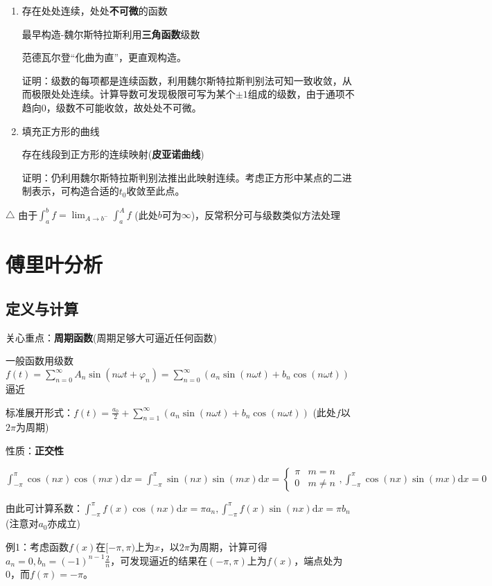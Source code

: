 \documentclass[a4paper,UTF8]{ctexart}
\begin{document}
\begin{enumerate}
\item 存在处处连续，处处\textbf{不可微}的函数
	
最早构造-魏尔斯特拉斯利用\textbf{三角函数}级数
	
范德瓦尔登“化曲为直”，更直观构造。
	
证明：级数的每项都是连续函数，利用魏尔斯特拉斯判别法可知一致收敛，从而极限处处连续。计算导数可发现极限可写为某个$\pm1$组成的级数，由于通项不趋向0，级数不可能收敛，故处处不可微。

\item 填充正方形的曲线

存在线段到正方形的连续映射(\textbf{皮亚诺曲线})

证明：仍利用魏尔斯特拉斯判别法推出此映射连续。考虑正方形中某点的二进制表示，可构造合适的$t_0$收敛至此点。
\end{enumerate}

$\triangle$ 由于$\int_a^b f=\lim_{A\to b^-}\int_a^A f$ (此处$b$可为$\infty$)，反常积分可与级数类似方法处理

\section{傅里叶分析}
\subsection{定义与计算}
关心重点：\textbf{周期函数}(周期足够大可逼近任何函数)

一般函数用级数$f(t)=\sum_{n=0}^\infty A_n\sin(n\omega t+\varphi_n)=\sum_{n=0}^\infty (a_n\sin(n\omega t)+b_n\cos(n\omega t))$逼近

标准展开形式：$f(t)=\frac{a_0}{2}+\sum_{n=1}^\infty (a_n\sin(n\omega t)+b_n\cos(n\omega t))$ (此处$f$以$2\pi$为周期)

性质：\textbf{正交性}

$\int_{-\pi}^\pi\cos(nx)\cos(mx)\mathrm{d}x=\int_{-\pi}^\pi\sin(nx)\sin(mx)\mathrm{d}x=\begin{cases}\pi&m=n\\0&m\neq n\end{cases},\int_{-\pi}^\pi\cos(nx)\sin(mx)\mathrm{d}x=0$

由此可计算系数：$\int_{-\pi}^\pi f(x)\cos(nx)\mathrm{d}x=\pi a_n,\int_{-\pi}^\pi f(x)\sin(nx)\mathrm{d}x=\pi b_n$ (注意对$a_0$亦成立)

例1：考虑函数$f(x)$在$[-\pi,\pi)$上为$x$，以$2\pi$为周期，计算可得$a_n=0,b_n=(-1)^{n-1}\frac{2}{n}$，可发现逼近的结果在$(-\pi,\pi)$上为$f(x)$，端点处为0，而$f(\pi)=-\pi$。
\end{document}
